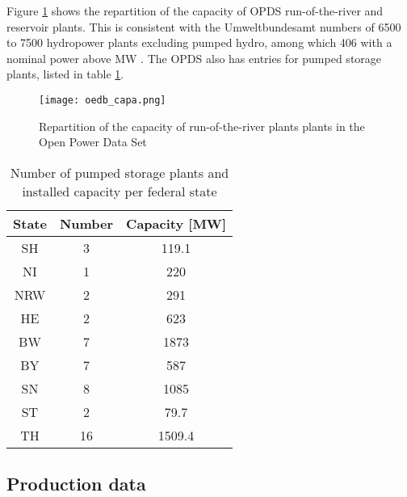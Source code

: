 Figure \ref{oedb_capa} shows the repartition of the capacity of OPDS run-of-the-river and reservoir plants. This is consistent with the Umweltbundesamt numbers of 6500 to 7500 hydropower plants excluding pumped hydro, among which 406 with a nominal power above \unit[1]{MW} \cite{uba_wasserkraft}. The OPDS also has entries for pumped storage plants, listed in table \ref{oedb_pump}.

\begin{figure}[H]
\centering
\texttt{[image: oedb\_capa.png]}
\caption[Repartition of the capacity of run-of-the-river and reservoir plants in the Open Power Data Set]{Repartition of the capacity of run-of-the-river plants plants in the Open Power Data Set}
\label{oedb_capa}
\end{figure}

\begin{table} [H]
\footnotesize
  \centering
  \caption[Number of pumped storage plants and installed capacity per federal state]{Number of pumped storage plants and installed capacity per federal state \cite{oedb}}
  \label{oedb_pump}
  \begin{tabular}{|c|cc| }
  \hline
  \textbf{State} & Number 	& 	Capacity [\unit{MW}] 	\\
  \hline
  SH	&	3	&	119.1	\\
  NI	&	1	&	220	\\
  NRW	&	2	&	291	\\
  HE	&	2	&	623	\\
  BW	&	7	&	1873	\\	
  BY	&	7	&	587	\\
  SN	&	8	&	1085	\\
  ST	&	2	&	79.7	\\
  TH	&	16	&	1509.4	\\
  \hline
  \end{tabular}
\end{table}

\subsection{Production data}
\label{sub:prod_data}

